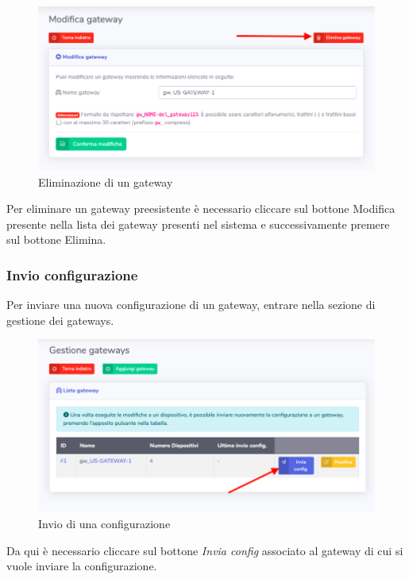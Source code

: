 		\begin{figure}[H]
		\centering
		\includegraphics[scale=0.600]{res/images/admin/elimGateway.png}
		\caption{Eliminazione di un gateway}
	\end{figure}


		Per eliminare un gateway preesistente è necessario cliccare sul bottone Modifica presente nella lista dei gateway presenti nel sistema e successivamente premere sul bottone Elimina.

	\subsubsection{Invio configurazione}

		Per inviare una nuova configurazione di un gateway, entrare nella sezione di gestione dei gateways.

		\begin{figure}[H]
		\centering
		\includegraphics[scale=0.600]{res/images/admin/inviaConfig.png}
		\caption{Invio di una configurazione}
	\end{figure}

		Da qui è necessario cliccare sul bottone \textit{Invia config} associato al gateway di cui si vuole inviare la configurazione.


